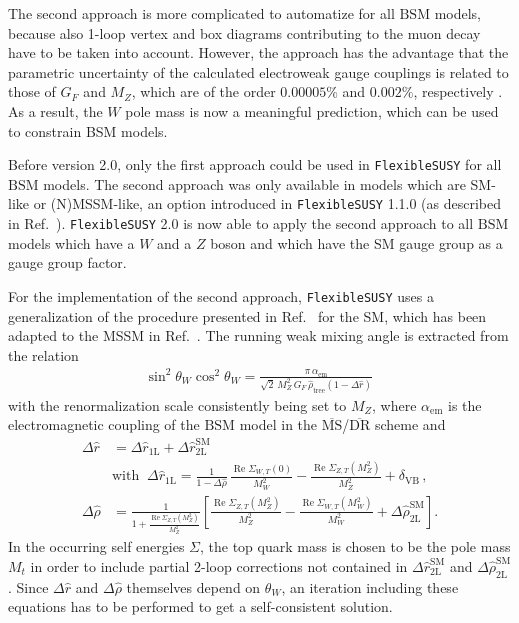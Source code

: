 \documentclass[final,3p,11pt,pdflatex]{elsarticle}
\makeatletter
\newcommand{\fs}{\texttt{FlexibleSUSY}\@\xspace}
\newcommand{\fstwo}{\fs 2.0\@\xspace}
\newcommand{\ol}[1]{\overline{#1}}
\newcommand{\MSbar}{\ensuremath{\ol{\text{MS}}}\xspace}
\newcommand{\DRbar}{\ensuremath{\ol{\text{DR}}}\xspace}
\newcommand{\SM}{\ensuremath{\text{SM}}\xspace}
\newcommand{\BSM}{\ensuremath{\text{BSM}}\xspace}
\newcommand{\deltaVB}{\ensuremath{\delta_{\text{VB}}}\xspace}
\DeclareMathOperator{\re}{Re}
\def\aem{\alpha_{\text{em}}}
\makeatother
\begin{document}
The second approach is more complicated to automatize for all \BSM
models, because also 1-loop vertex and box diagrams contributing to
the muon decay have to be taken into account.  However, the approach
has the advantage that the parametric uncertainty of the calculated
electroweak gauge couplings is related to those
of $G_F$ and $M_Z$, which are of the order $0.00005\%$
and $0.002\%$, respectively \cite{Olive:2016xmw}. As a result, the $W$
pole mass is now a meaningful prediction, which can be used to
constrain BSM models.

Before version 2.0, only the first approach could be used in \fs for
all \BSM models.  The second approach was only available in models
which are SM-like or (N)MSSM-like, an option introduced in \fs 1.1.0 (as described in Ref.\ \cite{Staub:2015aea}).
\fstwo is now able to apply the second approach to all \BSM models
which have a $W$ and a $Z$ boson and which have the SM gauge
group as a gauge group factor.

For the implementation of the second approach, \fs uses a
generalization of the procedure presented in Ref.~\cite{Degrassi:1990tu}
for the SM, which has been adapted to the MSSM in Ref.~\cite{Pierce:1996zz}.
The running weak mixing angle is extracted from the relation
\cite{Degrassi:1990tu}
%
\begin{align}
  \sin^2\theta_W \cos^2\theta_W =
  \frac{\pi\,\aem}
   {\sqrt{2}\,M_Z^2\,G_F\,\hat\rho_\text{tree} \left(1-\Delta\hat{r}\right)}\,
  \label{eq:muon_decay_master}
\end{align}
%
with the renormalization scale consistently being set to $M_Z$,
where $\aem$ is the electromagnetic coupling of the \BSM model in the
\MSbar/\DRbar scheme and
%
\begin{align}
  \Delta\hat{r} &= \Delta\hat{r}_\text{1L} + \Delta\hat{r}_\text{2L}^\SM \\
  &\text{with}\;\;
  \Delta\hat{r}_\text{1L} = \frac{1}{1-\Delta\hat\rho}\,\frac{\re\Sigma_{W,T}(0)}{M_W^2}
  - \frac{\re\Sigma_{Z,T}(M_Z^2)}{M_Z^2} + \deltaVB\,,
  \label{eq:Delta_r_hat}\\
  \Delta\hat\rho &= \frac{1}{1 + \frac{\re\Sigma_{Z,T}(M_Z^2)}{M_Z^2}}
  \left[\frac{\re\Sigma_{Z,T}(M_Z^2)}{M_Z^2} - \frac{\re\Sigma_{W,T}(M_W^2)}{M_W^2}
   + \Delta\hat\rho_\text{2L}^\SM\right].
   \label{eq:Delta_rho_hat}
\end{align}
%
In the occurring self energies $\Sigma$, the top quark mass is chosen
to be the pole mass $M_t$ in order to include partial 2-loop corrections not
contained in $\Delta\hat{r}_\text{2L}^\SM$ and $\Delta\hat\rho_\text{2L}^\SM$
\cite{Fanchiotti:1992tu}.
Since $\Delta\hat{r}$ and $\Delta\hat\rho$ themselves depend
on $\theta_W$, an iteration including these equations has to be
performed to get a self-consistent solution.
\end{document}
